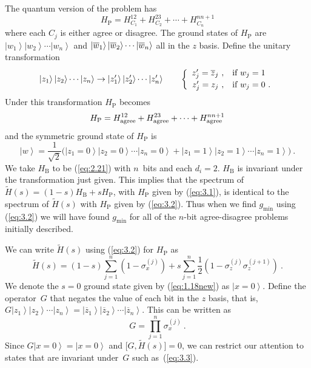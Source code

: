 \documentclass[twoside]{article}
\makeatletter
\newcommand{\half}{{\textstyle{\frac12}}}
\newcommand{\ket}[1]{\left|#1\right\rangle}
\newcommand{\numEq}[2]{\begin{equation}
   \label{eq:#1}
   #2\end{equation}}
\newcommand{\refEq}[1]{(\ref{eq:#1})}
\newcommand{\rP}{{\mathrm{P}}}
\newcommand{\rB}{{\mathrm{B}}}
\newcommand{\gm}{g_{\min}}
\let\tilde\widetilde
\let\bar\overline
\newcommand{\Cases}[1]{\left\{ 
  \begin{array}{r@{\ ,}@{\quad}l}
  #1
  \end{array}\right.}
\numberwithin{equation}{section}
\makeatother
\begin{document}
The quantum version of the problem has 
\numEq{3.1}{ H_\rP = H_{C_1}^{12} + H_{C_2}^{23} + \cdots + H_{C_n}^{nn+1} 
} where each $C_j$ is either agree or disagree.  The ground states of
$H_\rP$ are $\ket{w_1}\ket{w_2}\cdots\ket{w_n}$ and 
$\ket{\bar w_1}\*\ket{\bar w_2}\cdots\ket{\bar w_n}$ all in the $z$ basis.
Define the unitary transformation 
\numEq{3.2new}{
\ket{z_1}\ket{z_2}\cdots\ket{z_n} \to
\ket{z_1'}\ket{z_2'}\cdots\ket{z_n'} \qquad
\Cases{z_j'=\bar{z}_j & \mbox{if
$w_j=1$}\\[.5ex] z_j'=z_j & \mbox{if
$w_j=0$ .}} } Under this transformation $H_\rP$ becomes
\numEq{3.2}{ H_\rP = H_{\rm agree}^{12} + H_{\rm agree}^{23} + \cdots + 
H_{\rm agree}^{nn+1} } and the symmetric ground state of $H_\rP$ is 
\numEq{3.3}{
\ket w = \frac1{\sqrt2} \bigl(
\ket{z_1=0}\ket{z_2=0} \cdots \ket{z_n=0} +
\ket{z_1=1}\ket{z_2=1} \cdots \ket{z_n=1}\bigr)\ . } We take $H_\rB$ to
be \refEq{2.21} with $n$~bits and each $d_i=2$.
$H_\rB$ is invariant under the transformation just given. This implies that
the spectrum of $\tilde H(s) = (1-s) H_\rB + sH_\rP$,
 with $H_\rP$ given by \refEq{3.1}, is identical to the spectrum of $\tilde
H(s)$ 
 with $H_\rP$ given by \refEq{3.2}. Thus when we find
$\gm$ using \refEq{3.2} we will have found $\gm$ for all of the
$n$-bit agree-disagree problems initially described. 

We can write $\tilde H(s)$ using \refEq{3.2} for $H_\rP$ as 
\numEq{3.4}{
\tilde H(s) = (1-s) \sum_{j=1}^n  (1-\sigma_x^{(j)}) +  s \sum_{j=1}^n
\half(1-\sigma_z^{(j)} \sigma_z^{(j+1)})\ . } We denote the $s=0$ ground
state given by \refEq{1.18new} as $\ket{x=0}$. Define the operator~$G$
that negates the value of each bit in the $z$ basis, that is,
$G\ket{z_1}\ket{z_2}\cdots \ket{z_n} = 
\ket{\bar z_1}\ket{\bar z_2}\cdots \ket{\bar z_n}$.
 This can be written as 
\numEq{3.5}{ G = \prod_{j=1}^n \sigma_x^{(j)}\ .  } Since $G\ket{x=0} =
\ket{x=0} $ and $\bigl[ G, \tilde H(s)\bigr]=0$, we can restrict our attention
to states that are invariant under~$G$  such as~\refEq{3.3}. 
\end{document}
